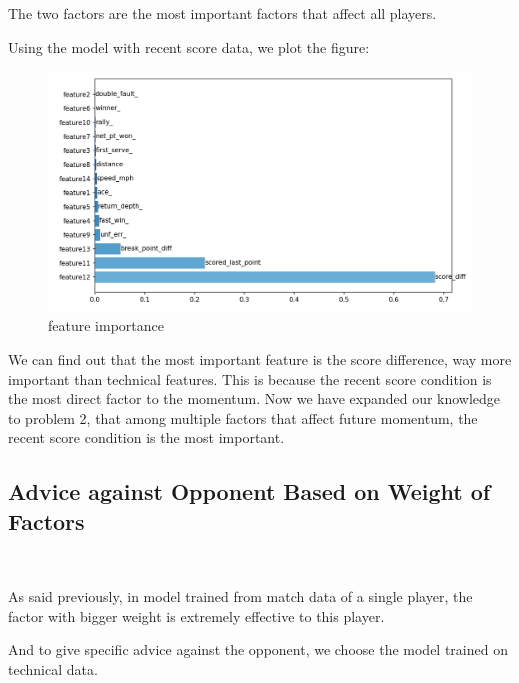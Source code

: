 The two factors are the most important factors that affect all players.

Using the model with recent score data, we plot the figure:

\begin{figure}[H]
    \centering
    \includegraphics[scale=0.6]{mainmatter/imgs/weight_with_score.jpg}
    \caption{feature importance}
\end{figure}

We can find out that the most important feature is the score difference,
way more important than technical features. 
This is because the recent score condition is the most direct factor to the momentum.
Now we have expanded our knowledge to problem 2, that among multiple factors
that affect future momentum, 
the recent score condition is the most important.

\subsection{Advice against Opponent Based on Weight of Factors}~{}

As said previously, in model trained from match data of a single player,
the factor with bigger weight is extremely effective to this player.

And to give specific advice against the opponent, we choose the model trained on technical data.

